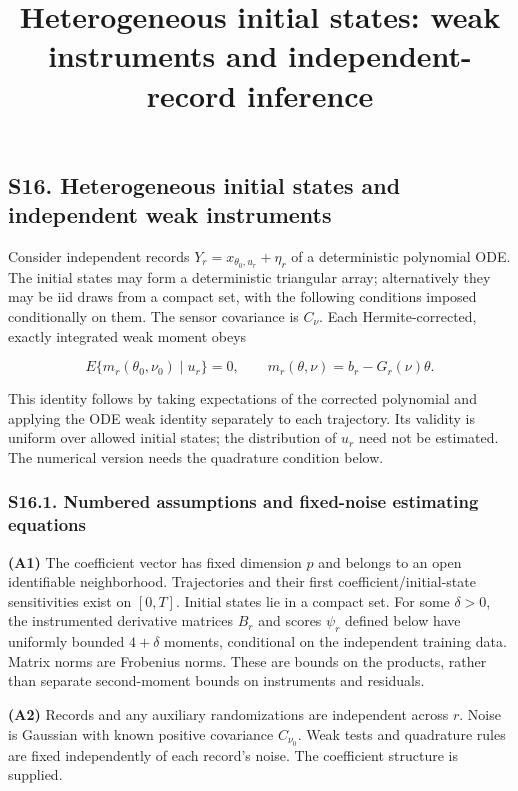 \documentclass[
  american,
  11pt,
]{article}
\title{Heterogeneous initial states: weak instruments and
independent-record inference}
\author{}
\date{}
\begin{document}
\maketitle

\subsection{S16. Heterogeneous initial states and independent weak
instruments}\label{s16.-heterogeneous-initial-states-and-independent-weak-instruments}

Consider independent records \(Y_r=x_{\theta_0,u_r}+\eta_r\) of a
deterministic polynomial ODE. The initial states may form a
deterministic triangular array; alternatively they may be iid draws from
a compact set, with the following conditions imposed conditionally on
them. The sensor covariance is \(C_\nu\). Each Hermite-corrected,
exactly integrated weak moment obeys

\[
E\{m_r(\theta_0,\nu_0)\mid u_r\}=0,
\qquad m_r(\theta,\nu)=b_r-G_r(\nu)\theta.
\]

This identity follows by taking expectations of the corrected polynomial
and applying the ODE weak identity separately to each trajectory. Its
validity is uniform over allowed initial states; the distribution of
\(u_r\) need not be estimated. The numerical version needs the
quadrature condition below.

\subsubsection{S16.1. Numbered assumptions and fixed-noise estimating
equations}\label{s16.1.-numbered-assumptions-and-fixed-noise-estimating-equations}

\textbf{(A1)} The coefficient vector has fixed dimension \(p\) and
belongs to an open identifiable neighborhood. Trajectories and their
first coefficient/initial-state sensitivities exist on \([0,T]\).
Initial states lie in a compact set. For some \(\delta>0\), the
instrumented derivative matrices \(B_r\) and scores \(\psi_r\) defined
below have uniformly bounded \(4+\delta\) moments, conditional on the
independent training data. Matrix norms are Frobenius norms. These are
bounds on the products, rather than separate second-moment bounds on
instruments and residuals.

\textbf{(A2)} Records and any auxiliary randomizations are independent
across \(r\). Noise is Gaussian with known positive covariance
\(C_{\nu_0}\). Weak tests and quadrature rules are fixed independently
of each record's noise. The coefficient structure is supplied.
\end{document}
